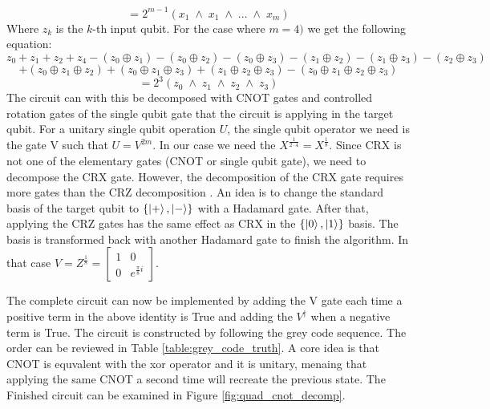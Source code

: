 \documentclass[12pt,a4paper]{article}
\begin{document}
\[
= 2^{m-1}(x_1 \; \land \; x_1 \; \land \; ... \; \land \; x_m)    
\]
Where \(z_k\) is the \(k\)-th input qubit. For the case where \(m=4)\) we get the following equation:
\[
z_0 + z_1 + z_2 + z_4 - (z_0 \oplus z_1) - (z_0 \oplus z_2) - (z_0 \oplus z_3) - (z_1 \oplus z_2) - (z_1 \oplus z_3) - (z_2 \oplus z_3) 
\] 
\[
+ (z_0 \oplus z_1 \oplus z_2) + (z_0 \oplus z_1 \oplus z_3) + (z_1 \oplus z_2 \oplus z_3) - (z_0 \oplus z_1 \oplus z_2 \oplus z_3) 
\] 
\[ 
= 2^{3}(z_0 \; \land \; z_1 \; \land \; z_2 \; \land \; z_3)
\]
The circuit can with this be decomposed with CNOT gates and controlled rotation gates of the single qubit gate that the circuit is applying in the target qubit. For a unitary single qubit operation \(U\), the single qubit operator we need is the gate V such that \(U = V^{2m}\). In our case we need the \(X^{\frac{1}{2 \cdot 4}} = X^{\frac{1}{8}}\). Since CRX is not one of the elementary gates (CNOT or single qubit gate), we need to decompose the CRX gate. However, the decomposition of the CRX gate requires more gates than the CRZ decomposition \cite{liu_analysis_2024}. An idea is to change the standard basis of the target qubit to \(\{\ket{+}, \ket{-}\}\) with a Hadamard gate. After that, applying the CRZ gates has the same effect as CRX in the \(\{\ket{0}, \ket{1}\}\) basis. The basis is transformed back with another Hadamard gate to finish the algorithm. In that case \(V = Z^{\frac{1}{8}} = \begin{bmatrix}1 & 0 \\ 0 & e^{\frac{\pi}{8}i} \end{bmatrix}\).

The complete circuit can now be implemented by adding the V gate each time a positive term in the above identity is True and adding the \(V^{\dagger}\) when a negative term is True. The circuit is constructed by following the grey code sequence. The order can be reviewed in Table \ref{table:grey_code_truth}. A core idea is that CNOT is equvalent with the xor operator and it is unitary, menaing that applying the same CNOT a second time will recreate the previous state. The Finished circuit can be examined in Figure \ref{fig:quad_cnot_decomp}.
\end{document}
